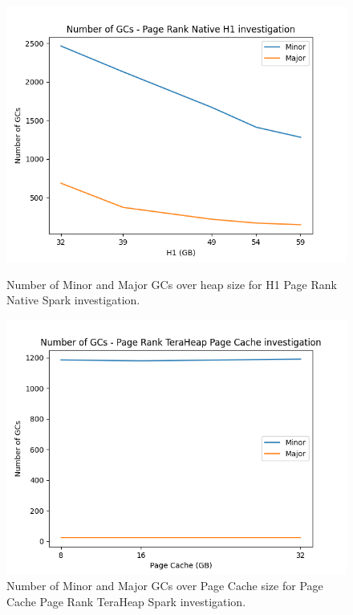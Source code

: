 \begin{figure}[thbp]
    \includegraphics[width=\linewidth]{./fig/gcs_pr_h1_native.png}
    \caption{Number of Minor and Major GCs over heap size for H1 Page Rank Native Spark
    investigation.}
    \label{fig:gcs_pr_h1_native}

    \includegraphics[width=\linewidth]{./fig/gcs_pr_pc_th.png}
    \caption{Number of Minor and Major GCs over Page Cache size for Page Cache Page Rank TeraHeap Spark
    investigation.}
    \label{fig:gcs_pr_pc_th}
\end{figure}

